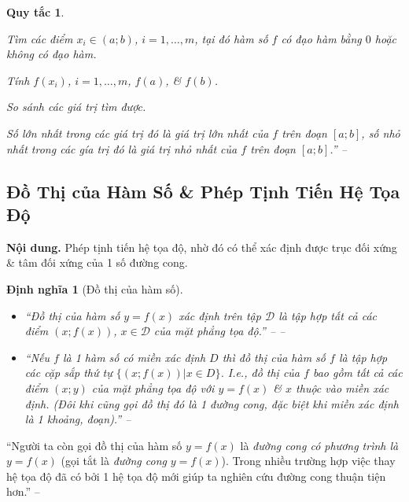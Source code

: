 \documentclass{article}
\numberwithin{equation}{section}
\newtheorem{dinhnghia}{Định nghĩa}[section]
\newtheorem{quytac}{Quy tắc}
\begin{document}
\begin{quytac}
	\begin{enumerate*}
		\item Tìm các điểm $x_i\in(a;b)$, $i = 1,\ldots,m$, tại đó hàm số $f$ có đạo hàm bằng $0$ hoặc không có đạo hàm.
		\item Tính $f(x_i)$, $i = 1,\ldots,m$, $f(a)$, \& $f(b)$.
		\item So sánh các giá trị tìm được.
	\end{enumerate*}
	Số lớn nhất trong các giá trị đó là giá trị lớn nhất của $f$ trên đoạn $[a;b]$, số nhỏ nhất trong các gía trị đó là giá trị nhỏ nhất của $f$ trên đoạn $[a;b]$.'' -- \cite[p. 21]{SGK_Toan_12_giai_tich_nang_cao}
\end{quytac}


\subsection{Đồ Thị của Hàm Số \& Phép Tịnh Tiến Hệ Tọa Độ}
\textsf{\textbf{Nội dung.} Phép tịnh tiến hệ tọa độ, nhờ đó có thể xác định được trục đối xứng \& tâm đối xứng của 1 số đường cong.}

\begin{dinhnghia}[Đồ thị của hàm số]
	\begin{itemize}
		\item ``\emph{Đồ thị của hàm số} $y = f(x)$ xác định trên tập $\mathcal{D}$ là tập hợp tất cả các điểm $(x;f(x))$, $x\in\mathcal{D}$ của mặt phẳng tọa độ.'' -- -- \cite[p. 24]{SGK_Toan_12_giai_tich_nang_cao}
		\item ``Nếu $f$ là 1 hàm số có miền xác định $D$ thì \emph{đồ thị} của hàm số $f$ là tập hợp các cặp sắp thứ tự $\{(x;f(x))|x\in D\}$. I.e., đồ thị của $f$ bao gồm tất cả các điểm $(x;y)$ của mặt phẳng tọa độ với $y = f(x)$ \& $x$ thuộc vào miền xác định. (Đôi khi cũng gọi đồ thị đó là 1 \emph{đường cong}, đặc biệt khi miền xác định là 1 khoảng, đoạn).'' -- \cite[p. 5]{TL_chuyen_Toan_Giai_Tich_12}
	\end{itemize}	
\end{dinhnghia}
``Người ta còn gọi đồ thị của hàm số $y = f(x)$ là \textit{đường cong có phương trình là $y = f(x)$} (gọi tắt là \textit{đường cong} $y = f(x)$). Trong nhiều trường hợp việc thay hệ tọa độ đã có bởi 1 hệ tọa độ mới giúp ta nghiên cứu đường cong thuận tiện hơn.'' -- \cite[p. 24]{SGK_Toan_12_giai_tich_nang_cao}
\end{document}
